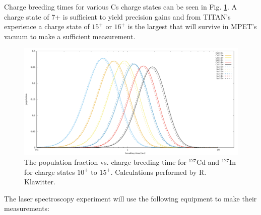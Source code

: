 \documentclass[12pt]{article}
\begin{document}
\begin{itemize}
    Charge breeding times for various Cs charge states can be seen in Fig. \ref{fig:charge_breeding}. A charge state of 7+ is sufficient to yield precision gains and from TITAN's experience \cite{Ettenauer2013,Klawitter2015} a charge state of $15^+$ or $16^+$ is the largest that will survive in MPET's vacuum to make a sufficient measurement.

    \begin{figure}[ht]
        \begin{center}
        \includegraphics[width=13cm]{for_dan.pdf}
        \caption[Cd Charge Breeding]{The population fraction vs. charge breeding time for $^{127}$Cd and $^{127}$In for charge states $10^{+}$ to $15^{+}$. Calculations performed by R. Klawitter.}
        \label{fig:charge_breeding}
        \end{center}
    \end{figure}

\end{itemize}

The laser spectroscopy experiment will use the following equipment to make their measurements:
\end{document}
